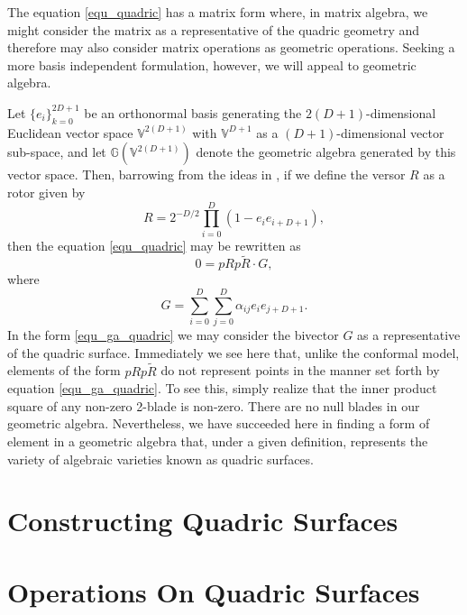 \documentclass{ecgd-l}
\theoremstyle{definition}
\theoremstyle{remark}
\numberwithin{equation}{section}
\newcommand{\G}{\mathbb{G}}
\newcommand{\V}{\mathbb{V}}
\begin{document}
The equation \eqref{equ_quadric} has a matrix form where, in matrix algebra, we might
consider the matrix as a representative of the quadric geometry and therefore may
also consider matrix operations
as geometric operations.  Seeking a more basis independent formulation, however, we will
appeal to geometric algebra.

Let $\{e_i\}_{k=0}^{2D+1}$ be an orthonormal basis generating the $2(D+1)$-dimensional
Euclidean vector space $\V^{2(D+1)}$ with $\V^{D+1}$ as a $(D+1)$-dimensional
vector sub-space, and let $\G\left(\V^{2(D+1)}\right)$ denote the geometric
algebra generated by this vector space.  Then, barrowing from the ideas in \cite{DoranHestenes93},
if we define the versor $R$ as a rotor given by
\begin{equation}
R = 2^{-D/2}\prod_{i=0}^D(1-e_ie_{i+D+1}),
\end{equation}
then the equation \eqref{equ_quadric} may be rewritten as
\begin{equation}\label{equ_ga_quadric}
0 = pRp\tilde{R}\cdot G,
\end{equation}
where
\begin{equation}
G = \sum_{i=0}^D\sum_{j=0}^D\alpha_{ij}e_i e_{j+D+1}.
\end{equation}
In the form \eqref{equ_ga_quadric} we may consider the bivector $G$ as
a representative of the quadric surface.  Immediately we see here that,
unlike the conformal model, elements of the form
$pRp\tilde{R}$ do not represent points in the manner set
forth by equation \eqref{equ_ga_quadric}.  To see this, simply
realize that the inner product square of any non-zero 2-blade
is non-zero.  There are no null blades in our geometric algebra.
Nevertheless, we have succeeded here in finding a form of element
in a geometric algebra that, under a given definition, represents the
variety of algebraic varieties known as quadric surfaces.

\section{Constructing Quadric Surfaces}



\section{Operations On Quadric Surfaces}
\end{document}
